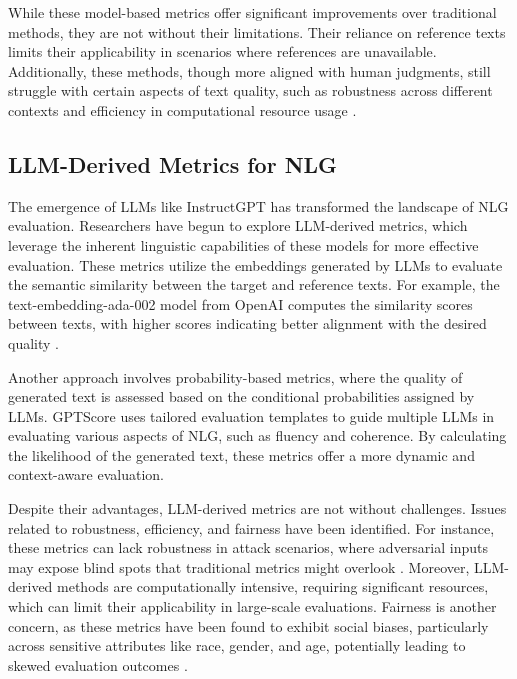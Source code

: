 While these model-based metrics offer significant improvements over traditional methods, they are not without their limitations. Their reliance on reference texts limits their applicability in scenarios where references are unavailable. Additionally, these methods, though more aligned with human judgments, still struggle with certain aspects of text quality, such as robustness across different contexts and efficiency in computational resource usage \cite{he2022blind}.

\subsection{LLM-Derived Metrics for NLG}

The emergence of LLMs like InstructGPT \cite{ouyang2022training} has transformed the landscape of NLG evaluation. Researchers have begun to explore LLM-derived metrics, which leverage the inherent linguistic capabilities of these models for more effective evaluation. These metrics utilize the embeddings generated by LLMs to evaluate the semantic similarity between the target and reference texts. For example, the text-embedding-ada-002 model from OpenAI computes the similarity scores between texts, with higher scores indicating better alignment with the desired quality \cite{es2023ragas}.

Another approach involves probability-based metrics, where the quality of generated text is assessed based on the conditional probabilities assigned by LLMs. GPTScore \cite{fu2023gptscore} uses tailored evaluation templates to guide multiple LLMs in evaluating various aspects of NLG, such as fluency and coherence. By calculating the likelihood of the generated text, these metrics offer a more dynamic and context-aware evaluation.

Despite their advantages, LLM-derived metrics are not without challenges. Issues related to robustness, efficiency, and fairness have been identified. For instance, these metrics can lack robustness in attack scenarios, where adversarial inputs may expose blind spots that traditional metrics might overlook \cite{he2022blind}. Moreover, LLM-derived methods are computationally intensive, requiring significant resources, which can limit their applicability in large-scale evaluations. Fairness is another concern, as these metrics have been found to exhibit social biases, particularly across sensitive attributes like race, gender, and age, potentially leading to skewed evaluation outcomes \cite{sun2022bertscore}.


